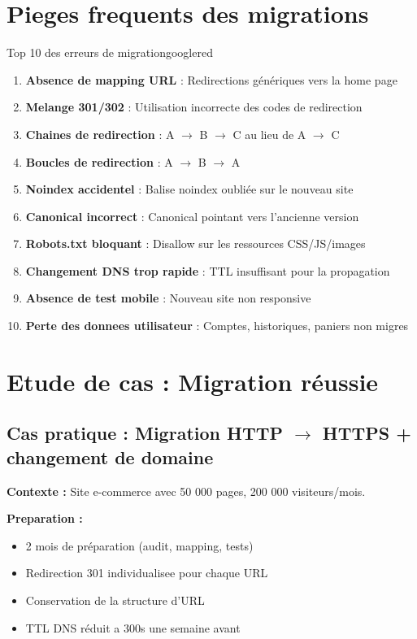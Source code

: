 \section{Pieges frequents des migrations}

\begin{mybox}{Top 10 des erreurs de migration}{googlered}
\begin{enumerate}
    \item \textbf{Absence de mapping URL} : Redirections génériques vers la home page
    \item \textbf{Melange 301/302} : Utilisation incorrecte des codes de redirection
    \item \textbf{Chaines de redirection} : A $\rightarrow$ B $\rightarrow$ C au lieu de A $\rightarrow$ C
    \item \textbf{Boucles de redirection} : A $\rightarrow$ B $\rightarrow$ A
    \item \textbf{Noindex accidentel} : Balise noindex oubliée sur le nouveau site
    \item \textbf{Canonical incorrect} : Canonical pointant vers l'ancienne version
    \item \textbf{Robots.txt bloquant} : Disallow sur les ressources CSS/JS/images
    \item \textbf{Changement DNS trop rapide} : TTL insuffisant pour la propagation
    \item \textbf{Absence de test mobile} : Nouveau site non responsive
    \item \textbf{Perte des donnees utilisateur} : Comptes, historiques, paniers non migres
\end{enumerate}
\end{mybox}

\section{Etude de cas : Migration réussie}

\subsection{Cas pratique : Migration HTTP $\rightarrow$ HTTPS + changement de domaine}

\textbf{Contexte :} Site e-commerce avec 50 000 pages, 200 000 visiteurs/mois.

\textbf{Preparation :}
\begin{itemize}
    \item 2 mois de préparation (audit, mapping, tests)
    \item Redirection 301 individualisee pour chaque URL
    \item Conservation de la structure d'URL
    \item TTL DNS réduit a 300s une semaine avant
\end{itemize}

